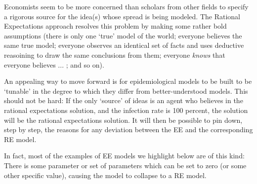 Economists seem to be more concerned than scholars from other fields to specify a rigorous source for the idea(s) whose spread is being modeled.  The Rational Expectations approach resolves this problem by making some rather bold assumptions (there is only one `true' model of the world; everyone believes the same true model; everyone observes an identical set of facts and uses deductive reasoining to draw the same conclusions from them; everyone \emph{knows} that everyone believes ... ; and so on).

An appealing way to move forward is for epidemiological models to be built to be `tunable' in the degree to which they differ from better-understood models.  This should not be hard:  If the only `source' of ideas is an agent who believes in the rational expectations solution, and the infection rate is 100 percent, the solution will be the rational expectations solution.  It will then be possible to pin down, step by step, the reasons for any deviation between the EE and the corresponding RE model.

In fact, most of the examples of EE models we highlight below are of this kind: There is some parameter or set of parameters which can be set to zero (or some other specific value), causing the model to collapse to a RE model.%

